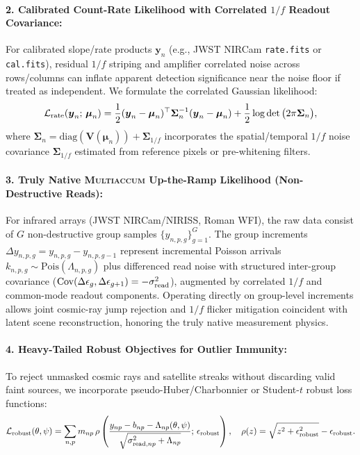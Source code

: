 \documentclass[11pt,a4paper]{article}
\begin{document}
\paragraph{2. Calibrated Count-Rate Likelihood with Correlated $1/f$ Readout Covariance:}
For calibrated slope/rate products $\boldsymbol{y}_n$ (e.g., JWST NIRCam \texttt{rate.fits} or \texttt{cal.fits}), residual $1/f$ striping and amplifier correlated noise across rows/columns can inflate apparent detection significance near the noise floor if treated as independent. We formulate the correlated Gaussian likelihood:
\begin{equation}
\mathcal{L}_{\rm rate}(\boldsymbol{y}_n ;\, \boldsymbol{\mu}_n) = \frac{1}{2} (\boldsymbol{y}_n - \boldsymbol{\mu}_n)^\top \boldsymbol{\Sigma}_n^{-1} (\boldsymbol{y}_n - \boldsymbol{\mu}_n) + \frac{1}{2} \log\det\big( 2\pi \boldsymbol{\Sigma}_n \big),
\end{equation}
where $\boldsymbol{\Sigma}_n = \mathrm{diag}(\boldsymbol{V}(\boldsymbol{\mu}_n)) + \boldsymbol{\Sigma}_{1/f}$ incorporates the spatial/temporal $1/f$ noise covariance $\boldsymbol{\Sigma}_{1/f}$ estimated from reference pixels or pre-whitening filters.

\paragraph{3. Truly Native \textsc{Multiaccum} Up-the-Ramp Likelihood (Non-Destructive Reads):}
For infrared arrays (JWST NIRCam/NIRISS, Roman WFI), the raw data consist of $G$ non-destructive group samples $\{y_{n, p, g}\}_{g=1}^G$. The group increments $\Delta y_{n, p, g} = y_{n, p, g} - y_{n, p, g-1}$ represent incremental Poisson arrivals $k_{n, p, g} \sim \mathrm{Pois}(\Lambda_{n, p, g})$ plus differenced read noise with structured inter-group covariance ($\mathrm{Cov}(\Delta \epsilon_g, \Delta \epsilon_{g+1}) = -\sigma_{\rm read}^2$), augmented by correlated $1/f$ and common-mode readout components. Operating directly on group-level increments allows joint cosmic-ray jump rejection and $1/f$ flicker mitigation coincident with latent scene reconstruction, honoring the truly native measurement physics.

\paragraph{4. Heavy-Tailed Robust Objectives for Outlier Immunity:}
To reject unmasked cosmic rays and satellite streaks without discarding valid faint sources, we incorporate pseudo-Huber/Charbonnier or Student-$t$ robust loss functions:
\begin{equation}
\mathcal{L}_{\rm robust}(\theta, \psi) = \sum_{n, p} m_{np} \, \rho\left( \frac{y_{np} - b_{np} - \Lambda_{np}(\theta, \psi)}{\sqrt{\sigma_{{\rm read}, np}^2 + \Lambda_{np}}} ;\, \epsilon_{\rm robust} \right), \quad \rho(z) = \sqrt{z^2 + \epsilon_{\rm robust}^2} - \epsilon_{\rm robust}.
\end{equation}
\end{document}
